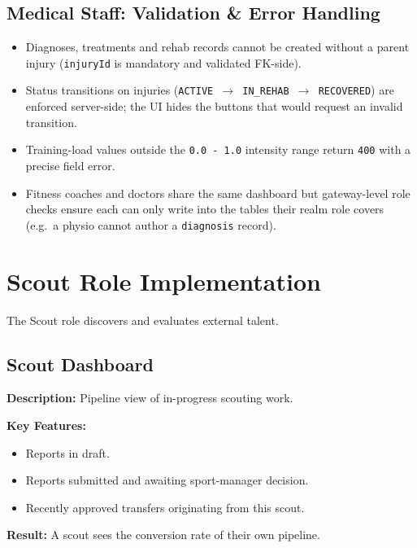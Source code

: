 \documentclass[12pt,a4paper,oneside]{report}
\begin{document}
\subsection*{Medical Staff: Validation \& Error Handling}
\begin{itemize}[leftmargin=*]
  \item Diagnoses, treatments and rehab records cannot be created
        without a parent injury (\texttt{injuryId} is mandatory and
        validated FK-side).
  \item Status transitions on injuries
        (\texttt{ACTIVE $\to$ IN\_REHAB $\to$ RECOVERED}) are
        enforced server-side; the UI hides the buttons that would
        request an invalid transition.
  \item Training-load values outside the \texttt{0.0 - 1.0}
        intensity range return \texttt{400} with a precise field
        error.
  \item Fitness coaches and doctors share the same dashboard but
        gateway-level role checks ensure each can only
        write into the tables their realm role covers (e.g.\ a
        physio cannot author a \texttt{diagnosis} record).
\end{itemize}

\section{Scout Role Implementation}
\label{sec:impl-scout}

The Scout role discovers and evaluates external talent.

\subsection*{Scout Dashboard}

\textbf{Description:} Pipeline view of in-progress scouting work.

\textbf{Key Features:}
\begin{itemize}[leftmargin=*]
  \item Reports in draft.
  \item Reports submitted and awaiting sport-manager decision.
  \item Recently approved transfers originating from this scout.
\end{itemize}

\textbf{Result:} A scout sees the conversion rate of their own
pipeline.
\end{document}
